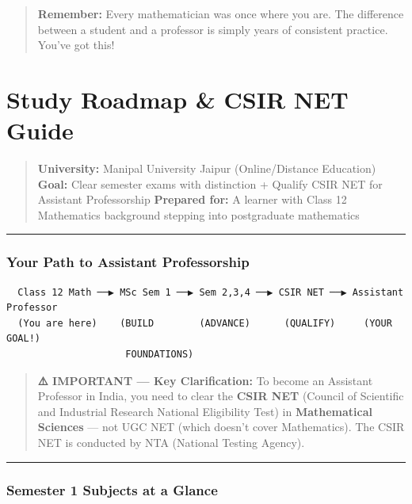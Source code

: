 \documentclass[12pt,a4paper,openany]{book}
\begin{document}
\begin{quote}
\textbf{Remember:} Every mathematician was once where you are. The difference between a student and a professor is simply years of consistent practice. You've got this! 
\end{quote}

\newpage

\chapter{Study Roadmap \& CSIR NET Guide}


\begin{quote}
\textbf{University:} Manipal University Jaipur (Online/Distance Education)
\textbf{Goal:} Clear semester exams with distinction + Qualify CSIR NET for Assistant Professorship
\textbf{Prepared for:} A learner with Class 12 Mathematics background stepping into postgraduate mathematics
\end{quote}

\bigskip\noindent\rule{\textwidth}{0.4pt}\bigskip

\subsection{ Your Path to Assistant Professorship}

\begin{verbatim}
  Class 12 Math ──▶ MSc Sem 1 ──▶ Sem 2,3,4 ──▶ CSIR NET ──▶ Assistant Professor
  (You are here)    (BUILD        (ADVANCE)      (QUALIFY)     (YOUR GOAL!)
                     FOUNDATIONS)
\end{verbatim}

\begin{quote}
\textbf{⚠️ IMPORTANT — Key Clarification:}
To become an Assistant Professor in India, you need to clear the \textbf{CSIR NET} (Council of Scientific and Industrial Research National Eligibility Test) in \textbf{Mathematical Sciences} — not UGC NET (which doesn't cover Mathematics). The CSIR NET is conducted by NTA (National Testing Agency).
\end{quote}

\bigskip\noindent\rule{\textwidth}{0.4pt}\bigskip

\subsection{ Semester 1 Subjects at a Glance}
\end{document}
